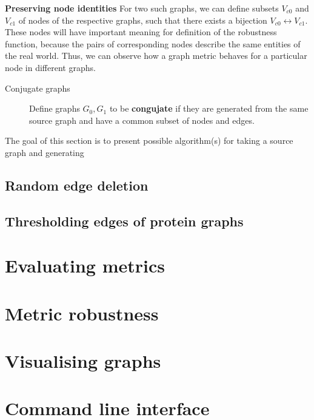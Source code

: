     \textbf{Preserving node identities} For two such graphs, we can define subsets $V_{c0}$ and $V_{c1}$ of nodes of the respective graphs, such that there exists a bijection $V_{c0} \leftrightarrow V_{c1}$. These nodes will have important meaning for definition of the robustness function, because the pairs of corresponding nodes describe the same entities of the real world. Thus, we can observe how a graph metric behaves for a particular node in different graphs.
    
    \begin{description}
        \item[Conjugate graphs] Define graphs $G_0, G_1$ to be \textbf{congujate} if they are generated from the same source graph and have a common subset of nodes and edges.
    \end{description}
    
    The goal of this section is to present possible algorithm(s) for taking a source graph and generating 

    \subsection{Random edge deletion}
    
    \subsection{Thresholding edges of protein graphs}

\section{Evaluating metrics}

\section{Metric robustness}

\section{Visualising graphs}

\section{Command line interface}


